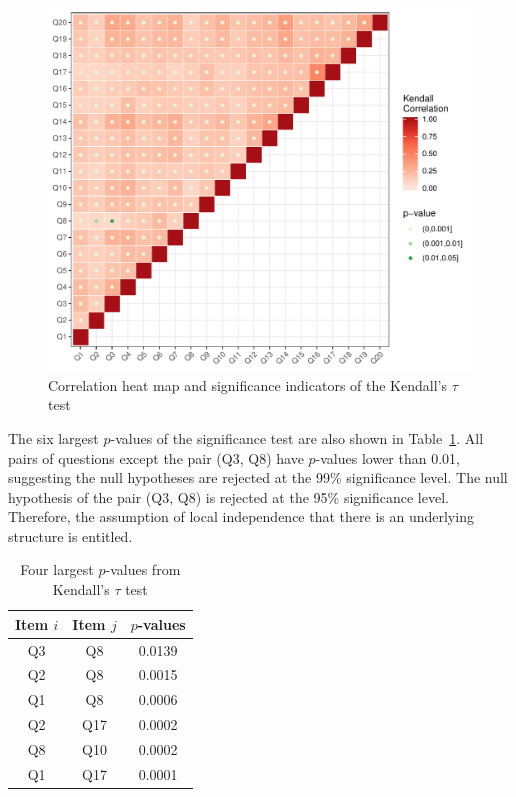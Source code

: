 \documentclass[a4paper]{report}
\begin{document}
\begin{figure}[H]
  \centering
  \includegraphics[width=\linewidth]{fig/IRT_cor_pre17.pdf}
  \caption{\label{fig:IRT_cor_pre17}Correlation heat map and significance indicators of the Kendall's $\tau$ test}
\end{figure}

The six largest $p$-values of the significance test are also shown in Table~\ref{tab:IRT_cortest}. All pairs of questions except the pair (Q3, Q8) have $p$-values lower than 0.01, suggesting the null hypotheses are rejected at the 99\% significance level. The null hypothesis of the pair (Q3, Q8) is rejected at the 95\% significance level. Therefore, the assumption of local independence that there is an underlying structure is entitled. 

\begin{table}[ht]
    \centering
    \begin{tabular}{ccc}
      \hline
    Item $i$ & Item $j$ & $p$-values \\ 
    \hline
    Q3 & Q8 & 0.0139 \\ 
      Q2 & Q8 & 0.0015 \\ 
      Q1 & Q8 & 0.0006 \\ 
      Q2 & Q17 & 0.0002 \\ 
      Q8 & Q10 & 0.0002 \\ 
      Q1 & Q17 & 0.0001 \\ 
       \hline
    \end{tabular}
    \caption{\label{tab:IRT_cortest}Four largest $p$-values from Kendall's $\tau$ test}
\end{table}
\end{document}
